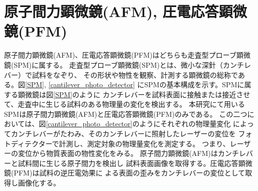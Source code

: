 \documentclass[dvipdfmx,12pt,a4paper]{jreport}
\begin{document}
	\section{原子間力顕微鏡(AFM), 圧電応答顕微鏡(PFM)}
	原子間力顕微鏡(AFM)、圧電応答顕微鏡(PFM)はどちらも走査型プローブ顕微鏡(SPM)に属する。
	走査型プローブ顕微鏡(SPM)とは、微小な深針（カンチレバー）で試料をなぞり、
	その形状や物性を観察、計測する顕微鏡の総称である。図\ref{SPM}, \ref{cantilever_photo_detector}
	にSPMの基本構成を示す。SPMに属する顕微鏡は図\ref{SPM}のように
	カンチレバーを試料表面に接触または接近させて、走査中に生じる試料のある物理量の変化を検出する。
	本研究にて用いるSPMは原子間力顕微鏡(AFM)と圧電応答顕微鏡(PFM)のみである。
	この二つにおいては、図\ref{cantilever_photo_detector}のようにそれぞれの物理量変化
	によってカンチレバーがたわみ、そのカンチレバーに照射したレーザーの変位を
	フォトディテクターで計測し、測定対象の物理量変化を測定する。
	つまり、レーザーの変位から物質表面の物性変化をみる。
	原子間力顕微鏡(AFM)はカンチレバーと試料間に生じる原子間力を検出し
	試料表面画像を取得する。圧電応答顕微鏡(PFM)は試料の逆圧電効果に
	よる表面の歪みをカンチレバーの変位として取得し画像化する。
\end{document}
